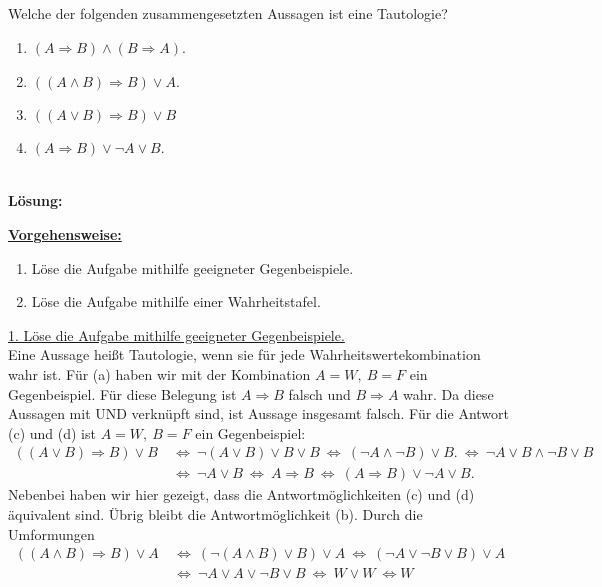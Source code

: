 \subsection*{}
Welche der folgenden zusammengesetzten Aussagen ist eine Tautologie? 
\renewcommand{\labelenumi}{(\alph{enumi})}
\begin{enumerate}
	\item $(A \Rightarrow B ) \wedge (B \Rightarrow A)$.
	\item $ ((A \wedge B) \Rightarrow B) \vee A$.
	\item $ ((A \vee B) \Rightarrow B) \vee B$
	\item $(A \Rightarrow B ) \vee \neg A \vee B$.
\end{enumerate}
\ \\
\textbf{Lösung:}
\begin{mdframed}
	\underline{\textbf{Vorgehensweise:}}
	\renewcommand{\labelenumi}{\theenumi.}
	\begin{enumerate}
		\item Löse die Aufgabe mithilfe geeigneter Gegenbeispiele.
		\item Löse die Aufgabe mithilfe einer Wahrheitstafel.
	\end{enumerate}
\end{mdframed}
\underline{1. Löse die Aufgabe mithilfe geeigneter Gegenbeispiele.}\\
Eine Aussage heißt Tautologie, wenn sie für jede Wahrheitswertekombination wahr ist.
Für (a) haben wir mit der Kombination $A = W, \ B = F$ ein Gegenbeispiel. Für diese Belegung ist $A \Rightarrow B$ falsch und $  B \Rightarrow A$ wahr. Da diese Aussagen mit UND verknüpft sind, ist Aussage insgesamt falsch.
Für die Antwort (c) und (d) ist $A = W, \ B = F$ ein Gegenbeispiel:
\begin{align*}
	((A \vee B) \Rightarrow B) \vee B
	\ &\Leftrightarrow \
	\neg(A \vee B ) \vee B \vee B
	\ \Leftrightarrow \
	(\neg A \wedge \neg B) \vee B.
	\ \Leftrightarrow \
	\neg A \vee B \wedge \neg B \vee B\\
	\ &\Leftrightarrow \
	\neg A \vee B 
	\ \Leftrightarrow \
	A \Rightarrow B
	\ \Leftrightarrow \
	(A \Rightarrow B) \vee \neg A \vee B.
\end{align*}
Nebenbei haben wir hier gezeigt, dass die Antwortmöglichkeiten (c) und (d) äquivalent sind. Übrig bleibt die Antwortmöglichkeit (b). Durch die Umformungen
\begin{align*}
	((A \wedge B) \Rightarrow B) \vee A
	\ &\Leftrightarrow \
	(\neg (A \wedge B) \vee B) \vee A
	\ \Leftrightarrow \
	(\neg A \vee \neg B \vee B) \vee A\\
	\ &\Leftrightarrow \
	\neg A \vee A \vee \neg B \vee B
	\ \Leftrightarrow \
	W \vee W \ \Leftrightarrow W
\end{align*}
